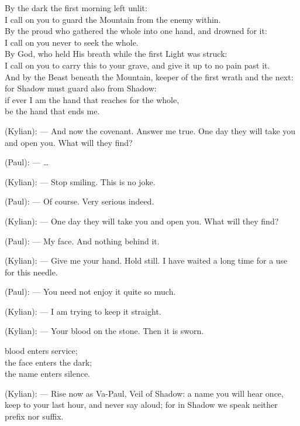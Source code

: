 \begin{room}
\begin{scripture}
By the dark the first morning left unlit: \\
I call on you to guard the Mountain from the enemy within. \\
By the proud who gathered the whole into one hand, and drowned for it: \\
I call on you never to seek the whole. \\
By God, who held His breath while the first Light was struck: \\
I call on you to carry this to your grave, and give it up to no pain past it. \\
And by the Beast beneath the Mountain, keeper of the first wrath and the next: \\
for Shadow must guard also from Shadow: \\
if ever I am the hand that reaches for the whole, \\
be the hand that ends me.
\end{scripture}

(Kylian): --- And now the covenant. Answer me true. One day they will take you and open you. What will they find?

(Paul): --- \ldots{}

(Kylian): --- Stop smiling. This is no joke.

(Paul): --- Of course. Very serious indeed.

(Kylian): --- One day they will take you and open you. What will they find?

(Paul): --- My face. And nothing behind it.

(Kylian): --- Give me your hand. Hold still. I have waited a long time for a use for this needle.

(Paul): --- You need not enjoy it quite so much.

(Kylian): --- I am trying to keep it straight.

\centerline{}

(Kylian): --- Your blood on the stone. Then it is sworn.

\begin{scripture}
blood enters service; \\
the face enters the dark; \\
the name enters silence.
\end{scripture}

(Kylian): --- Rise now as Va-Paul, Veil of Shadow: a name you will hear once, keep to your last hour, and never say aloud; for in Shadow we speak neither prefix nor suffix.


\end{room}

